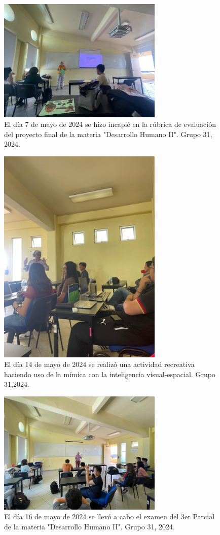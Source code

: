 \begin{figure}
    \caption{El día 7 de mayo de 2024 se hizo incapi\'e en la r\'ubrica de evaluaci\'on del proyecto final de la materia "Desarrollo Humano II". Grupo 31, 2024.\label{fig:No.4}}
    \includegraphics[width=0.7\textwidth]{./assets/img/imagen4DH.jpeg}
\end{figure}

\begin{figure}
    \caption{El d\'ia 14 de mayo de 2024 se realiz\'o una actividad recreativa haciendo uso de la m\'imica con la inteligencia visual-espacial. Grupo 31,2024.\label{fig:No.5}}
    \includegraphics[width=0.7\textwidth]{./assets/img/imagen5DH.jpeg}
\end{figure}

\begin{figure}
    \caption{El d\'ia 16 de mayo de 2024 se llev\'o a cabo el examen del 3er Parcial de la materia "Desarrollo Humano II". Grupo 31, 2024.\label{fig:No.6}}
    \includegraphics[width=0.7\textwidth]{./assets/img/imagen6DH.jpeg}
\end{figure}
